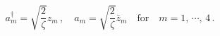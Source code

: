 \begin{equation}
 a^{\dagger}_m=\sqrt{\frac{2}{\zeta}}z_m\,,\quad 
 a_m=\sqrt{\frac{2}{\zeta}}\bar{z}_m\quad 
\textrm{for}\quad m=1,\,\cdots,\,4\,.\label{eq:5.3}
\end{equation}

